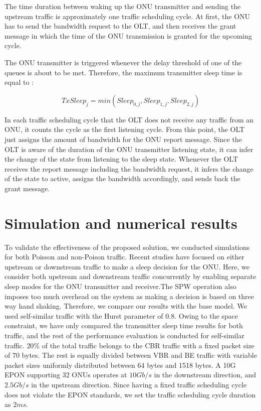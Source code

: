 \documentclass[11pt,english,12pt,onecolumn, draftcls]{IEEEtran}
\theoremstyle{plain}
\theoremstyle{definition}
\begin{document}
The time duration between waking up the ONU transmitter and sending the upstream traffic is approximately one traffic scheduling cycle. At first, the ONU has to send the bandwidth request to the OLT, and then receives the grant message in which the time of the ONU transmission is granted for the upcoming cycle.

The ONU transmitter is triggered whenever the delay threshold of one of the queues is about to be met. Therefore, the maximum transmitter sleep time is equal to :

\begin{equation}
TxSleep_j = min(Sleep_{0,j},Sleep_{1,j},Sleep_{2,j})
\end{equation}

In each traffic scheduling cycle that the OLT does not receive any traffic from an ONU, it counts the cycle as the first listening cycle. From this point, the OLT just assigns the amount of bandwidth for the ONU report message. Since the OLT is aware of the duration of the ONU transmitter listening state, it can infer the change of the state from listening to the sleep state. Whenever the OLT receives the report message including the bandwidth request, it infers the change of the state to active, assigns the bandwidth accordingly, and sends back the grant message.

\section{Simulation and numerical results}
\label{sec: sim}
To validate the effectiveness of the proposed solution, we conducted simulations for both Poisson and non-Poison traffic. Recent studies have focused on either upstream or downstream traffic to make a sleep decision for the ONU. Here, we consider both upstream and downstream traffic concurrently by enabling separate sleep modes for the ONU transmitter and receiver.The SPW operation also imposes too much overhead on the system as making a decision is based on three way hand shaking. Therefore, we compare our results with the base model.  We used self-similar traffic with the Hurst parameter of 0.8. Owing to the space constraint, we have only compared the transmitter sleep time results for both traffic, and the rest of the performance evaluation is conducted for self-similar traffic. $20\%$ of the total traffic belongs to the CBR traffic with a fixed packet size of 70 bytes. The rest is equally divided between VBR and BE traffic with variable packet sizes uniformly distributed between 64 bytes and 1518 bytes. A 10G EPON supporting 32 ONUs operates at $10 Gb/s$ in the downstream direction, and $2.5 Gb/s$ in the upstream direction. Since having a fixed traffic scheduling cycle does not violate the EPON standards, we set the traffic scheduling cycle duration as $2ms$.
\end{document}
